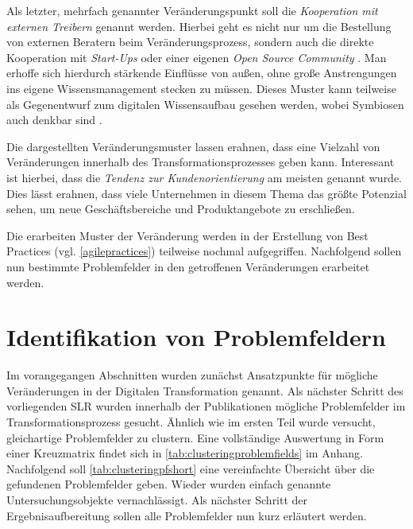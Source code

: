 Als letzter, mehrfach genannter Veränderungspunkt soll die \textit{Kooperation mit externen Treibern} genannt werden. Hierbei geht  es nicht nur um die Bestellung von externen Beratern beim Veränderungsprozess, sondern auch die direkte Kooperation mit \textit{Start-Ups} oder einer eigenen \textit{Open Source Community} \cite[S. 139]{urbach_digitalization_2018}. Man erhoffe sich hierdurch stärkende Einflüsse von außen, ohne große Anstrengungen ins eigene Wissensmanagement stecken zu müssen. Dieses Muster kann teilweise als Gegenentwurf zum digitalen Wissensaufbau gesehen werden, wobei Symbiosen auch denkbar sind \cite[S. 154]{urbach_digitalization_2018}.

Die dargestellten Veränderungsmuster lassen erahnen, dass eine Vielzahl von Veränderungen innerhalb des Transformationsprozesses geben kann. Interessant ist hierbei, dass die \textit{Tendenz zur Kundenorientierung} am meisten genannt wurde. Dies lässt erahnen, dass viele Unternehmen in diesem Thema das größte Potenzial sehen, um neue Geschäftsbereiche und Produktangebote zu erschließen.

Die erarbeiten Muster der Veränderung werden in der Erstellung von Best Practices (vgl. \ref{agilepractices}) teilweise nochmal aufgegriffen. Nachfolgend sollen nun bestimmte Problemfelder in den getroffenen  Veränderungen erarbeitet werden.

\section{Identifikation von Problemfeldern}


Im vorangegangen Abschnitten wurden zunächst Ansatzpunkte für mögliche Veränderungen in der Digitalen Transformation genannt. Als nächster Schritt des vorliegenden SLR wurden innerhalb der Publikationen mögliche Problemfelder im Transformationsprozess gesucht. Ähnlich wie im ersten Teil wurde versucht, gleichartige Problemfelder zu clustern. Eine vollständige Auswertung in Form einer Kreuzmatrix findet sich in \ref{tab:clusteringproblemfields} im Anhang. Nachfolgend soll \ref{tab:clusteringpfshort} eine vereinfachte Übersicht über die gefundenen  Problemfelder geben. Wieder wurden einfach genannte Untersuchungsobjekte vernachlässigt. Als nächster Schritt  der Ergebnisaufbereitung sollen alle Problemfelder nun kurz erläutert werden.

